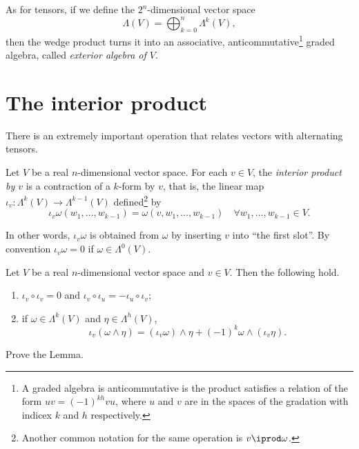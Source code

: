 \begin{remark}
  As for tensors, if we define the $2^n$-dimensional vector space
  \begin{equation}
    \Lambda(V) = \bigoplus_{k=0}^n \Lambda^k(V),
  \end{equation}
  then the wedge product turns it into an associative, anticommutative\footnote{A graded algebra is anticommutative is the product satisfies a relation of the form $uv = {(-1)}^{kh}vu$, where $u$ and $v$ are in the spaces of the gradation with indicex $k$ and $h$ respectively.} graded algebra, called \emph{exterior algebra of $V$}.
\end{remark}

\section{The interior product}

There is an extremely important operation that relates vectors with alternating tensors.

\begin{definition}
  Let $V$ be a real $n$-dimensional vector space.
  For each $v\in V$, the \emph{interior product by $v$} is a contraction of a $k$-form by $v$, that is, the linear map $\iota_v:\Lambda^{k}(V)\to \Lambda^{k-1}(V)$ defined\footnote{Another common notation for the same operation is $v \iprod \omega$.} by
  \begin{equation}
    \iota_v\omega(w_1,\ldots,w_{k-1}) = \omega(v,w_1,\ldots,w_{k-1})
    \quad \forall w_1,\ldots,w_{k-1} \in V.
  \end{equation}
\end{definition}

In other words, $\iota_v\omega$ is obtained from $\omega$ by inserting $v$ into ``the first slot''.
By convention $\iota_v\omega = 0$ if $\omega\in\Lambda^0(V)$.

\begin{lemma}\label{lemma:intprod}
  Let $V$ be a real $n$-dimensional vector space and $v\in V$.
  Then the following hold.
  \begin{enumerate}
    \item $\iota_v\circ \iota_v = 0$ and $\iota_v\circ\iota_u = -\iota_u\circ\iota_v$;
    \item if $\omega\in\Lambda^k(V)$ and $\eta\in\Lambda^h(V)$,
    \begin{equation}
      \iota_v(\omega\wedge\eta) = (\iota_v\omega)\wedge\eta + {(-1)}^k\omega\wedge(\iota_v\eta).
    \end{equation}
  \end{enumerate}
\end{lemma}
\begin{exercise}
  Prove the Lemma.
\end{exercise}

